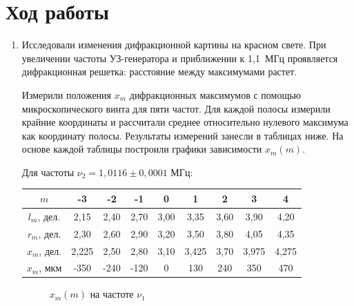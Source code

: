 \documentclass[a4paper, 12pt]{article}%
\begin{document}
	\section{Ход работы}
	\begin{enumerate}
	    \item Исследовали изменения дифракционной картины на красном свете. При увеличении частоты УЗ-генератора и приближении к 1,1~МГц проявляется дифракционная решетка: расстояние между максимумами растет.
	    
	    Измерили положения $ x_m $ дифракционных максимумов с помощью микроскопического винта для пяти частот. Для каждой полосы измерили крайние координаты и рассчитали среднее относительно нулевого максимума как координату полосы. Результаты измерений занесли в таблицах ниже. На основе каждой таблицы построили графики зависимости $ x_m (m) $.
	    
	    Для частоты $\nu_2=1{,}0116\pm 0{,}0001$ МГц:
	    \begin{center}
	    \begin{tabular}{|c|c|c|c|c|c|c|c|c|}
            \hline
            $m$ & -3 & -2 & -1 & 0 & 1 & 2 & 3 & 4 \\ \hline
            $l_m$, дел. & 2,15 & 2,40 & 2,70 & 3,00 & 3,35 & 3,60 & 3,90 & 4,20 \\ \hline
            $r_m$, дел. & 2,30 & 2,60 & 2,90 & 3,20 & 3,50 & 3,80 & 4,05 & 4,35 \\ \hline
            $x_m$, дел. & 2,225 & 2,50 & 2,80 & 3,10 & 3,425 & 3,70 & 3,975 & 4,275 \\ \hline
            $x_m$, мкм & -350 & -240 & -120 & 0 & 130 & 240 & 350 & 470 \\ \hline
        \end{tabular}
	    \end{center}
	\begin{figure}[!htb] \centering
		\caption{$x_m(m)$ на частоте $\nu_1$}
	\end{figure}
	

\end{enumerate}
\end{document}
